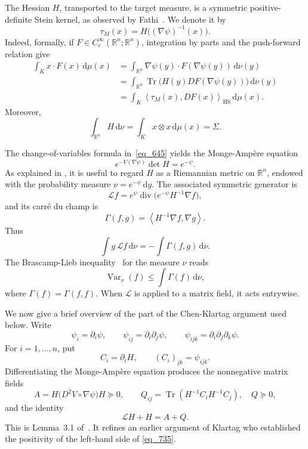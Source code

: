 \documentclass[12pt]{article}
\theoremstyle{definition}
\theoremstyle{remark}
\newcommand{\R}{\mathbb R}
\newcommand{\Var}{\operatorname{Var}}
\newcommand{\Tr}{\operatorname{Tr}}
\newcommand{\HS}{\mathrm{HS}}
\newcommand{\dd}{\,\mathrm d}
\newcommand{\ip}[2]{\left\langle #1,#2\right\rangle}
\newcommand{\cL}{\mathcal L}
\newcommand{\tauM}{\tau_M}
\begin{document}
The Hessian $H$, transported to the target measure, is a symmetric
positive-definite Stein kernel, as observed by
Fathi~\cite[Theorem~2.3]{Fathi}. We denote it by
\begin{equation}\label{eq_666}
  \tauM(x)=H\bigl((\nabla\psi)^{-1}(x)\bigr).
\end{equation}
Indeed, formally, if $F\in C_c^\infty(\R^n;\R^n)$, integration by
parts and the push-forward relation give
\begin{align*}
  \int_Kx\cdot F(x)\dd\mu(x)
  &=\int_{\R^n}\nabla\psi(y)\cdot F(\nabla\psi(y))\dd\nu(y)\\
  &=\int_{\R^n}\Tr\bigl(H(y)DF(\nabla\psi(y))\bigr)\dd\nu(y)\\
  &=\int_K\ip{\tauM(x)}{DF(x)}_{\HS}\dd\mu(x).
\end{align*}
Moreover,
\begin{equation}\label{eq_678}
  \int_{\R^n}H\dd\nu
  =\int_Kx\otimes x\dd\mu(x)
  =\Sigma.
\end{equation}

The change-of-variables formula in~\eqref{eq_645} yields the
Monge-Amp\`ere equation
\begin{equation}\label{eq_686}
  e^{-V(\nabla\psi)}\det H=e^{-\psi}.
\end{equation}
As explained in \cite{KlartagMoment}, it is useful to regard $H$ as a Riemannian
metric on $\R^n$, endowed with the probability measure
$\nu=e^{-\psi}\dd y$. The associated symmetric generator is
\begin{equation}\label{eq_692}
  \cL f
  =e^\psi\operatorname{div}\bigl(e^{-\psi}H^{-1}\nabla f\bigr),
\end{equation}
and its carr\'e du champ is
\begin{equation}\label{eq_697}
  \Gamma(f,g)=\ip{H^{-1}\nabla f}{\nabla g}.
\end{equation}
Thus
\[
  \int g\,\cL f\dd\nu=-\int\Gamma(f,g)\dd\nu.
\]
The Brascamp-Lieb inequality~\cite{BrascampLieb} for the measure
$\nu$ reads
\begin{equation}\label{eq_706}
  \Var_\nu(f)\leq\int\Gamma(f)\dd\nu,
\end{equation}
where $\Gamma(f)=\Gamma(f,f)$. When $\cL$ is applied to a matrix
field, it acts entrywise.

We now give a brief overview of the part of the Chen-Klartag argument
used below. Write
\[
  \psi_i=\partial_i\psi,
  \qquad
  \psi_{ij}=\partial_i\partial_j\psi,
  \qquad
  \psi_{ijk}=\partial_i\partial_j\partial_k\psi.
\]
For $i=1,\ldots,n$, put
\[
  C_i=\partial_iH,
  \qquad (C_i)_{jk}=\psi_{ijk}.
\]
Differentiating the Monge-Amp\`ere equation produces the
nonnegative matrix fields
\begin{equation}\label{eq_728}
  A=H\bigl(D^2V\circ\nabla\psi\bigr)H\succeq0,
  \qquad
  Q_{ij}=\Tr(H^{-1}C_iH^{-1}C_j),
  \quad Q\succeq0,
\end{equation}
and the identity
\begin{equation}\label{eq_735}
  \cL H+H=A+Q.
\end{equation}
This is Lemma~3.1 of~\cite{ChenKlartag}. It refines an earlier argument of Klartag \cite{KlartagMoment} who established the positivity of the left-hand side of \eqref{eq_735}.
\end{document}

